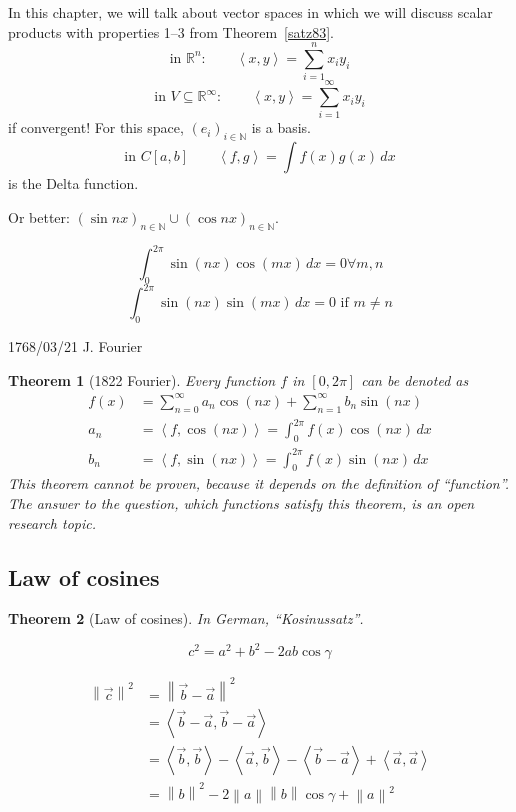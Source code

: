 \documentclass{article}
\newtheorem{theorem}{Theorem}  \numberwithin{theorem}{section}
\newcommand{\angel}[1]{\left\langle#1\right\rangle}
\newcommand{\norm}[1]{\left\|#1\right\|}
\newcommand{\rh}[1]{\vec{#1}}
\begin{document}
In this chapter, we will talk about vector spaces in which we will discuss scalar products with properties 1--3 from Theorem~\ref{satz83}.
\[ \text{in } \mathbb R^n: \qquad \angel{x,y} = \sum_{i=1}^n x_i y_i \]
\[ \text{in } V \subseteq \mathbb R^\infty: \qquad \angel{x,y} = \sum_{i=1}^\infty x_i y_i \]
if convergent! For this space, $(e_i)_{i \in \mathbb N}$ is a basis.
\[ \text{in } C[a,b] \qquad \angel{f,g} = \int f(x) g(x) \, dx \]
is the Delta function.

Or better: $(\sin{nx})_{n \in \mathbb N} \cup (\cos{nx})_{n \in \mathbb N}$.

\[ \int_0^{2\pi} \sin(nx) \cos(mx) \, dx = 0 \forall m,n \]
\[ \int_0^{2\pi} \sin(nx) \sin(mx) \, dx = 0 \text{ if } m \neq n \]

1768/03/21 J. Fourier

\begin{theorem}[1822 Fourier]
  Every function $f$ in $[0,2\pi]$ can be denoted as
  \begin{align*}
    f(x) &= \sum_{n=0}^\infty a_n \cos(nx) + \sum_{n=1}^\infty b_n \sin(nx) \\
    a_n &= \angel{f, \cos(nx)} = \int_0^{2\pi} f(x) \cos(nx) \, dx \\
    b_n &= \angel{f, \sin(nx)} = \int_0^{2\pi} f(x) \sin(nx) \, dx
  \end{align*}
  This theorem cannot be proven, because it depends on the definition of \enquote{function}.
  The answer to the question, which functions satisfy this theorem, is an open research topic.
\end{theorem}

\subsection{Law of cosines}

\begin{theorem}[Law of cosines]
  In German, \foreignlanguage{german}{\enquote{Kosinussatz}}.

  \[ c^2 = a^2 + b^2 - 2ab \cos{\gamma} \]

  \begin{align*}
    \norm{\rh{c}}^2 &= \norm{\rh{b} - \rh{a}}^2 \\
      &= \angel{\rh{b} - \rh{a}, \rh{b} - \rh{a}} \\
      &= \angel{\rh{b}, \rh{b}} - \angel{\rh{a}, \rh{b}} - \angel{\rh{b} - \rh{a}} + \angel{\rh{a}, \rh{a}} \\
      &= \norm{b}^2 - 2 \norm{a} \norm{b} \cos\gamma + \norm{a}^2
  \end{align*}
\end{theorem}
\end{document}
